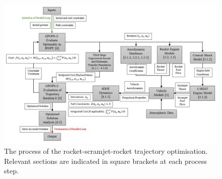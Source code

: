 \begin{landscape}%
	\begin{figure}[ht]
		\centering
		\includegraphics[width=0.98\linewidth]{"figures/4_LODESTAR/Ascent Flowchart"}
		\caption{The process of the rocket-scramjet-rocket trajectory optimisation. Relevant sections are indicated in square brackets at each process step.}
		\label{fig:AscentFlowchart}
	\end{figure} 
\end{landscape}

